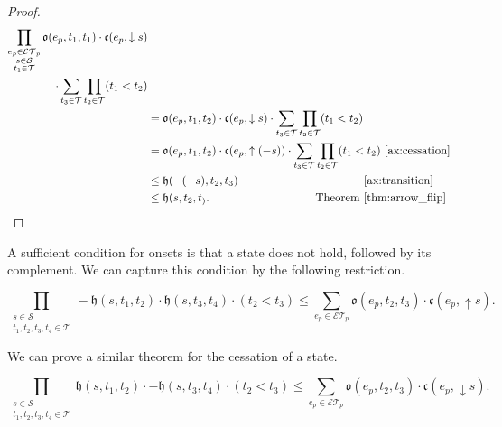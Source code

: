\begin{proof}
    \begin{align*}
        \prod_{\substack{e_p \in \mathcal{ET}_p \\ s \in \mathcal{S} \\ t_1 \in \mathcal{T}}}\mathfrak{o}(e_p, t_1, t_1) \cdot \mathfrak{c}(e_p, \downarrow s)\\    \cdot
       \sum_{t_3 \in \mathcal{T}} \prod_{t_2 \in \mathcal{T}} (t_1 < t_2)                                                                            \\
        &= \mathfrak{o}(e_p, t_1, t_2) \cdot \mathfrak{c}(e_p, \downarrow s)               \cdot
       \sum_{t_3 \in \mathcal{T}} \prod_{t_2 \in \mathcal{T}} (t_1 < t_2)                                                                         \\
         & = \mathfrak{o}(e_p, t_1, t_2) \cdot \mathfrak{c}(e_p, \uparrow (-s))  \cdot
       \sum_{t_3 \in \mathcal{T}} \prod_{t_2 \in \mathcal{T}} (t_1 < t_2)         \text{~\ref{ax:cessation}}                   \\
         & \leq \mathfrak{h}(-(-s), t_2, t_3) \hspace{0.31 \textwidth}   \text{~\ref{ax:transition}} \\
         & \leq  \mathfrak{h}(s, t_2, t_).  \hspace{0.27 \textwidth }  \text{Theorem~\ref{thm:arrow_flip}}
    \end{align*}
\end{proof}

A sufficient condition for onsets is that a state does not hold, followed by its complement. We can capture this condition by the following restriction.

\begin{equation}\label{ax:transition_2}
    \prod_{\substack{s \in \mathcal{S} \\ t_1, t_2, t_3, t_4 \in \mathcal{T}}}- \mathfrak{h}(s, t_1, t_2) \cdot \mathfrak{h}(s, t_3, t_4) \cdot (t_2 < t_3)\leq
    \sum_{e_p \in \mathcal{ET}_p} \mathfrak{o}(e_p, t_2, t_3) \cdot \mathfrak{c}(e_p, \uparrow s).
\end{equation}

We can prove a similar theorem for the cessation of a state.

\begin{theorem}\label{thm:cessation_3}
    \begin{equation}
     \prod_{\substack{s \in \mathcal{S} \\ t_1, t_2, t_3, t_4 \in \mathcal{T}}}    \mathfrak{h}(s, t_1, t_2) \cdot - \mathfrak{h}(s, t_3, t_4) \cdot (t_2 < t_3)\leq
     \sum_{e_p \in \mathcal{ET}_p} \mathfrak{o}(e_p, t_2, t_3) \cdot \mathfrak{c}(e_p, \downarrow s).
    \end{equation}

\end{theorem}

